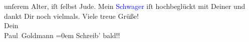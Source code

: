               unſerem Alter, iſt ſelbst Jude.\pend
           \pstart
           Mein \textcolor{blue}{Schwager}{} iſt
               hochbeglückt mit Deiner \label{K_L02621-7v}\label{K_L02621-7h}
               und dankt Dir noch vielmals.\pend
           \pstart
           Viele treue Grüße! {\\[\baselineskip]}Dein {\\[\baselineskip]}\spacefill\mbox{Paul Goldmann}\pend
           \leftskip=0em{}\pstart
           \noindent{}Schreib’ bald!!\pend
           \endnumbering{}\begin{anhang}\end{anhang}
      